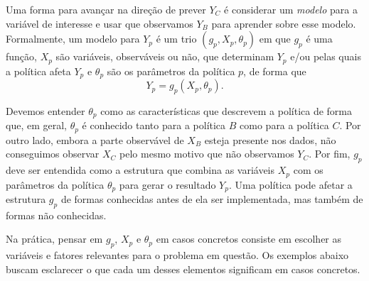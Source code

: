 \documentclass[12pt, a4paper, openany]{book}
\numberwithin{equation}{chapter}
\numberwithin{table}{chapter}
\numberwithin{figure}{chapter}
\theoremstyle{break}
\begin{document}
Uma forma para avançar na direção de prever $Y_C$ é considerar um \textit{modelo} para a variável de interesse e usar que observamos $Y_B$ para aprender sobre esse modelo. Formalmente, um modelo para $Y_p$ é um trio $(g_p, X_p, \theta_p)$ em que $g_p$ é uma função, $X_p$ são variáveis, observáveis ou não, que determinam $Y_p$ e/ou pelas quais a política afeta $Y_p$ e $\theta_p$ são os parâmetros da política $p$, de forma que
\begin{equation}
\label{eq:model}
Y_p=g_p(X_p, \theta_p).
\end{equation}

Devemos entender $\theta_p$ como as características que descrevem a política de forma que, em geral, $\theta_p$ é conhecido tanto para a política $B$ como para a política $C$. Por outro lado, embora a parte observável de $X_B$ esteja presente nos dados, não conseguimos observar $X_C$ pelo mesmo motivo que não observamos $Y_C$. Por fim, $g_p$ deve ser entendida como a estrutura que combina as variáveis $X_p$ com os parâmetros da política $\theta_p$ para gerar o resultado $Y_p$. Uma política pode afetar a estrutura $g_p$ de formas conhecidas antes de ela ser implementada, mas também de formas não conhecidas. 

Na prática, pensar em $g_p$, $X_p$ e $\theta_p$ em casos concretos consiste em escolher as variáveis e fatores relevantes para o problema em questão. Os exemplos abaixo buscam esclarecer o que cada um desses elementos significam em casos concretos. 
\end{document}
